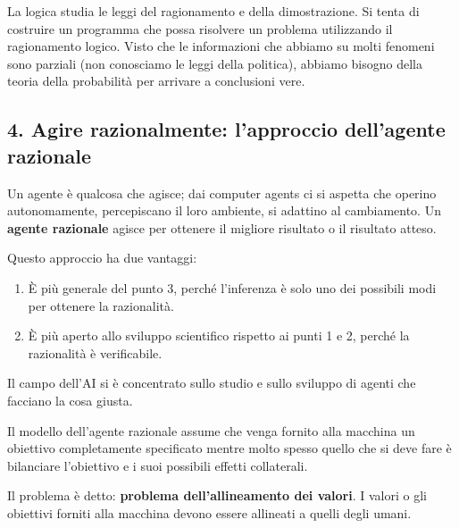 La logica studia le leggi del ragionamento e della dimostrazione.
Si tenta di costruire un programma che possa risolvere un problema utilizzando il ragionamento logico.
Visto che le informazioni che abbiamo su molti fenomeni sono parziali (non conosciamo le leggi della politica), abbiamo bisogno della teoria della probabilit\`a per arrivare a conclusioni vere.

\subsection*{4. Agire razionalmente: l'approccio dell'agente razionale}

Un agente \`e qualcosa che agisce; dai computer agents ci si aspetta che operino autonomamente, percepiscano il loro ambiente, si adattino al cambiamento.
Un \textbf{agente razionale} agisce per ottenere il migliore risultato o il risultato atteso.

Questo approccio ha due vantaggi:
\begin{enumerate}
  \item \`E pi\`u generale del punto 3, perch\'e l'inferenza \`e solo uno dei possibili modi per ottenere la razionalit\`a.
  \item \`E pi\`u aperto allo sviluppo scientifico rispetto ai punti 1 e 2, perch\'e la razionalit\`a \`e verificabile.
\end{enumerate}

Il campo dell'AI si \`e concentrato sullo studio e sullo sviluppo di agenti che facciano la cosa giusta.

Il modello dell'agente razionale assume che venga fornito alla macchina un obiettivo completamente specificato mentre molto spesso quello che si deve fare \`e bilanciare l'obiettivo e i suoi possibili effetti collaterali.

Il problema \`e detto: \textbf{problema dell'allineamento dei valori}. I valori o gli obiettivi forniti alla macchina devono essere allineati a quelli degli umani.

